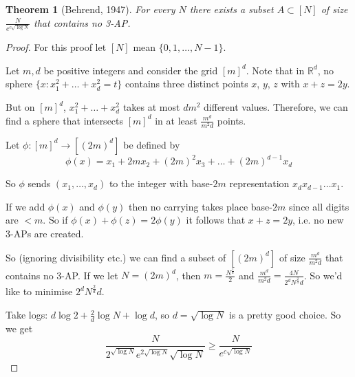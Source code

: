 \documentclass[a4paper]{article}
\newtheorem{theorem}[lemma]{Theorem}
\begin{document}
\begin{theorem}[Behrend, 1947]
	For every $N$ there exists a subset $A \subset [N]$ of size $\frac{N}{e^{c\sqrt{\log N}}}$ that contains no 3-AP.
\end{theorem}
\begin{proof}
	For this proof let $[N]$ mean $\{0,1,\dots,N-1\}$.
	
	Let $m, d$ be positive integers and consider the grid $[m]^{d}$. Note that in $\mathbb{R}^d$, no sphere $\{x: x_1^2 + \dots + x_d^2 =t \}$ contains three distinct points $x$, $y$, $z$ with $x+z=2y$.
	
	But on $[m]^d$, $x_1^2+ \dots + x_d ^2$ takes at most $dm^2$ different values. Therefore, we can find a sphere that intersects $[m]^d$ in at least $\frac{m^d}{m^2d}$ points.
	
	Let $\phi: [m]^d \to [(2m)^d]$ be defined by $$\phi(x) = x_1 + 2mx_2 + (2m)^2x_3 + \dots + (2m)^{d-1}x_d$$
	
	So $\phi$ sends $(x_1, \dots, x_d)$ to the integer with base-$2m$ representation $x_dx_{d-1}\dots x_1$.
	
	If we add $\phi(x)$ and $\phi(y)$ then no carrying takes place base-$2m$ since all digits are $<m$. So if $\phi(x) + \phi(z) = 2\phi(y)$ it follows that $x+z=2y$, i.e. no new 3-APs are created.
	
	So (ignoring divisibility etc.) we can find a subset of $[(2m)^d]$ of size $\frac{m^d}{m^2d}$ that contains no 3-AP. If we let $N=(2m)^d$, then $m=\frac{N^{\frac{1}{d}}}{2}$ and $\frac{m^d}{m^2d} = \frac{4N}{2^dN^\frac{2}{d}d}$. So we'd like to minimise $2^dN^\frac{2}{d}d$.
	
	Take logs: $d\log 2 + \frac{2}{d}\log N + \log d$, so $d = \sqrt{\log N}$ is a pretty good choice. So we get $$\frac{N}{2^{\sqrt{\log N}}e^{2 \sqrt{\log N}}\sqrt{\log N}} \geq \frac{N}{e^{c \sqrt{ \log N}}}$$
\end{proof}
\end{document}
